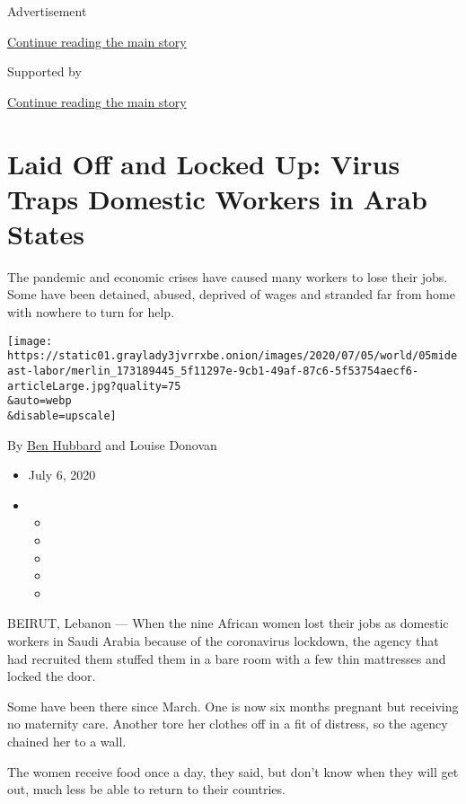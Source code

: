 Advertisement

\protect\hyperlink{after-top}{Continue reading the main story}

Supported by

\protect\hyperlink{after-sponsor}{Continue reading the main story}

\hypertarget{laid-off-and-locked-up-virus-traps-domestic-workers-in-arab-states}{%
\section{Laid Off and Locked Up: Virus Traps Domestic Workers in Arab
States}\label{laid-off-and-locked-up-virus-traps-domestic-workers-in-arab-states}}

The pandemic and economic crises have caused many workers to lose their
jobs. Some have been detained, abused, deprived of wages and stranded
far from home with nowhere to turn for help.

\texttt{[image: https://static01.graylady3jvrrxbe.onion/images/2020/07/05/world/05mideast-labor/merlin\_173189445\_5f11297e-9cb1-49af-87c6-5f53754aecf6-articleLarge.jpg?quality=75\\\&auto=webp\\\&disable=upscale]}

By \href{https://www.nytimes3xbfgragh.onion/by/ben-hubbard}{Ben Hubbard}
and Louise Donovan

\begin{itemize}
\item
  July 6, 2020
\item
  \begin{itemize}
  \item
  \item
  \item
  \item
  \item
  \end{itemize}
\end{itemize}

BEIRUT, Lebanon --- When the nine African women lost their jobs as
domestic workers in Saudi Arabia because of the coronavirus lockdown,
the agency that had recruited them stuffed them in a bare room with a
few thin mattresses and locked the door.

Some have been there since March. One is now six months pregnant but
receiving no maternity care. Another tore her clothes off in a fit of
distress, so the agency chained her to a wall.

The women receive food once a day, they said, but don't know when they
will get out, much less be able to return to their countries.

